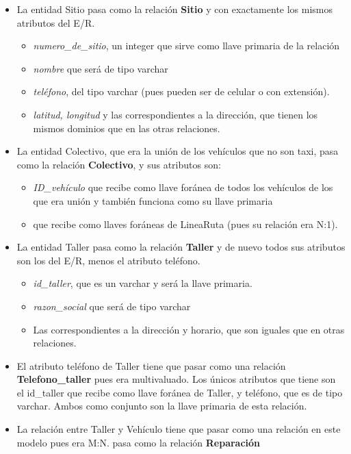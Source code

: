 \documentclass[11pt]{article}
\begin{document}
\begin{itemize}
\item La entidad Sitio pasa como la relación \textbf{Sitio} y con exactamente los mismos atributos del E/R.
    \begin{itemize}
    \item \textit{numero\_de\_sitio}, un integer que sirve como llave primaria de la relación
    \item \textit{nombre} que será de tipo varchar 
    \item \textit{teléfono}, del tipo varchar (pues pueden ser de celular o con extensión).
    \item \textit{latitud, longitud} y las correspondientes a la dirección, que tienen los mismos dominios que en las otras relaciones.
    \end{itemize}   
\item La entidad Colectivo, que era la unión de los vehículos que no son taxi, pasa como la relación \textbf{Colectivo}, y sus atributos son:
    \begin{itemize}
    \item \textit{ID\_vehículo} que recibe como llave foránea de todos los vehículos de los que era unión y también funciona como su llave primaria
    \item {} que recibe como llaves foráneas de LineaRuta (pues su relación era N:1).
    \end{itemize}        
\item La entidad Taller pasa como la relación \textbf{Taller} y de nuevo todos sus atributos son los del E/R, menos el atributo teléfono.
    \begin{itemize}
    \item \textit{id\_taller}, que es un varchar y será la llave primaria.
    \item \textit{razon\_social} que será de tipo varchar
    \item Las correspondientes a la dirección y horario, que son iguales que en otras relaciones.
    \end{itemize}   
\item El atributo teléfono de Taller tiene que pasar como una relación \textbf{Telefono\_taller} pues era multivaluado. Los únicos atributos que tiene son el id\_taller que recibe como llave foránea de Taller, y teléfono, que es de tipo varchar. Ambos como conjunto son la llave primaria de esta relación.
\item La relación entre Taller y Vehículo tiene que pasar como una relación en este modelo pues era M:N. pasa como la relación \textbf{Reparación} %

\end{itemize}
\end{document}
